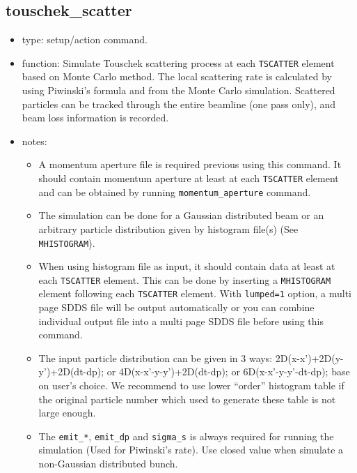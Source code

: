 \documentclass[11pt]{article}
\begin{document}
\subsection{touschek\_scatter \label{subsec:touschekscatter}}
\begin{itemize}
\item type: setup/action command.
\item function: Simulate Touschek scattering process at each \verb|TSCATTER| element 
   based on Monte Carlo method. The local scattering rate is
   calculated by using Piwinski's formula and from the Monte Carlo
   simulation. Scattered particles can be tracked through the entire
   beamline (one pass only), and beam loss information is recorded.
\item notes: 
	\begin{itemize} 
      \item A momentum aperture file is required previous using this command. It
      should contain momentum aperture at least at each \verb|TSCATTER| element and can be
      obtained by running \verb|momentum_aperture| command. 
      \item The simulation can be done for a Gaussian distributed beam or an arbitrary 
      particle distribution given by histogram file(s) (See \verb|MHISTOGRAM|).  
      \item When using histogram file as input, it should contain data at least at each 
      \verb|TSCATTER| element. This can be done by inserting a \verb|MHISTOGRAM| element 
      following each \verb|TSCATTER| element. With \verb|lumped=1| option, a multi page 
      SDDS file will be output automatically or you can combine individual output file 
      into a multi page SDDS file before using this command.
      \item The input particle distribution can be given in 3 ways: 2D(x-x')+2D(y-y')+2D(dt-dp);
      or 4D(x-x'-y-y')+2D(dt-dp); or 6D(x-x'-y-y'-dt-dp); base on user's choice. We recommend
      to use lower ``order'' histogram table if the original particle number which used to generate
      these table is not large enough.
      \item The \verb|emit_*|, \verb|emit_dp| and \verb|sigma_s| is always required for running
      the simulation (Used for Piwinski's rate). Use closed value when simulate a non-Gaussian 
      distributed bunch. 
	\end{itemize}
\end{itemize}
\end{document}

